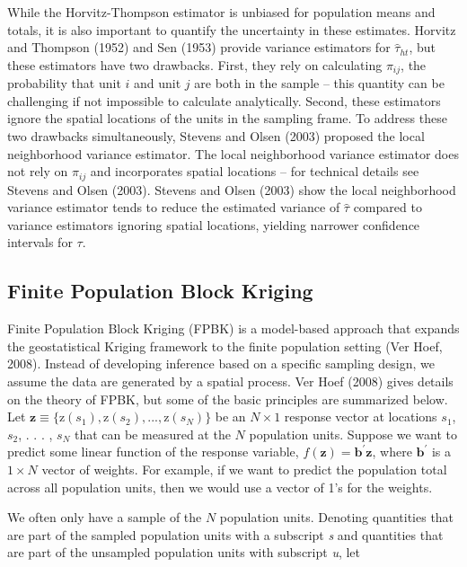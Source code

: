 \documentclass[]{elsarticle} %
\begin{document}
While the Horvitz-Thompson estimator is unbiased for population means
and totals, it is also important to quantify the uncertainty in these
estimates. Horvitz and Thompson (1952) and Sen (1953) provide variance
estimators for \(\hat{\tau}_{ht}\), but these estimators have two
drawbacks. First, they rely on calculating \(\pi_{ij}\), the probability
that unit \(i\) and unit \(j\) are both in the sample -- this quantity
can be challenging if not impossible to calculate analytically. Second,
these estimators ignore the spatial locations of the units in the
sampling frame. To address these two drawbacks simultaneously, Stevens
and Olsen (2003) proposed the local neighborhood variance estimator. The
local neighborhood variance estimator does not rely on \(\pi_{ij}\) and
incorporates spatial locations -- for technical details see Stevens and
Olsen (2003). Stevens and Olsen (2003) show the local neighborhood
variance estimator tends to reduce the estimated variance of
\(\hat{\tau}\) compared to variance estimators ignoring spatial
locations, yielding narrower confidence intervals for \(\tau\).

\hypertarget{finite-population-block-kriging}{%
\subsection{Finite Population Block
Kriging}\label{finite-population-block-kriging}}

Finite Population Block Kriging (FPBK) is a model-based approach that
expands the geostatistical Kriging framework to the finite population
setting (Ver Hoef, 2008). Instead of developing inference based on a
specific sampling design, we assume the data are generated by a spatial
process. Ver Hoef (2008) gives details on the theory of FPBK, but some
of the basic principles are summarized below. Let
\({\mathbf{z} \equiv \{\text{z}(s_1), \text{z}(s_2), . . . , \text{z}(s_N) \}}\)
be an \(N \times 1\) response vector at locations \(s_1\), \(s_2\), . .
. , \(s_N\) that can be measured at the \(N\) population units. Suppose
we want to predict some linear function of the response variable,
\(f(\mathbf{z}) = \mathbf{b}^\prime \mathbf{z}\), where
\(\mathbf{b}^\prime\) is a \(1 \times N\) vector of weights. For
example, if we want to predict the population total across all
population units, then we would use a vector of 1's for the weights.

We often only have a sample of the \(N\) population units. Denoting
quantities that are part of the sampled population units with a
subscript \emph{s} and quantities that are part of the unsampled
population units with subscript \emph{u}, let
\end{document}
